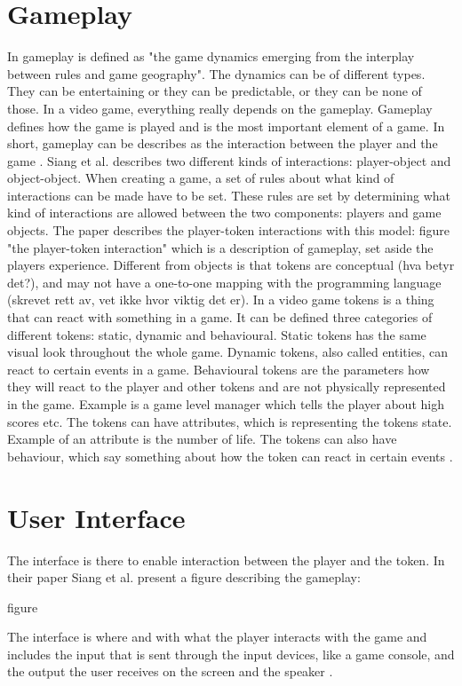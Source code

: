 \section{Gameplay}

In \cite{understandingvg} gameplay is defined as "the game dynamics emerging from the interplay between rules and game geography". The dynamics can be of different types. They can be entertaining or they can be predictable, or they can be none of those. In a video game, everything really depends on the gameplay. Gameplay defines how the game is played and is the most important element of a game. In short, gameplay can be describes as the interaction between the player and the game \cite{umlapproach}. Siang et al. describes two different kinds of interactions: player-object and object-object. When creating a game, a set of rules about what kind of interactions can be made have to be set. These rules are set by determining what kind of interactions are allowed between the two components: players and game objects. The paper describes the player-token interactions with this model:
figure "the player-token interaction"
which is a description of gameplay, set aside the players experience. 
Different from objects is that tokens are conceptual (hva betyr det?), and may not have a one-to-one mapping with the programming language (skrevet rett av, vet ikke hvor viktig det er).
In a video game tokens is a thing that can react with something in a game. It can be defined three categories of different tokens: static, dynamic and behavioural. Static tokens has the same visual look throughout the whole game. Dynamic tokens, also called entities, can react to certain events in a game. Behavioural tokens are the parameters how they will react to the player and other tokens and are not physically represented in the game. Example is a game level manager which tells the player about high scores etc. The tokens can have attributes, which is representing the tokens state. Example of an attribute is the number of life. The tokens can also have behaviour, which say something about how the token can react in certain events \cite{umlapproach}.

\section{User Interface}
The interface is there to enable interaction between the player and the token. In their paper Siang et al. present a figure describing the gameplay:

figure

The interface is where and with what the player interacts with the game and includes the input that is sent through the input devices, like a game console, and the output the user receives on the screen and the speaker \cite{umlapproach}.

